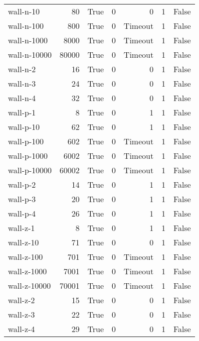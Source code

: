 \begin{longtable}{lrlrrrl}
wall-n-10 & 80 & True & 0 & 0 & 1 & False \\
wall-n-100 & 800 & True & 0 & Timeout & 1 & False \\
wall-n-1000 & 8000 & True & 0 & Timeout & 1 & False \\
wall-n-10000 & 80000 & True & 0 & Timeout & 1 & False \\
wall-n-2 & 16 & True & 0 & 0 & 1 & False \\
wall-n-3 & 24 & True & 0 & 0 & 1 & False \\
wall-n-4 & 32 & True & 0 & 0 & 1 & False \\
wall-p-1 & 8 & True & 0 & 1 & 1 & False \\
wall-p-10 & 62 & True & 0 & 1 & 1 & False \\
wall-p-100 & 602 & True & 0 & Timeout & 1 & False \\
wall-p-1000 & 6002 & True & 0 & Timeout & 1 & False \\
wall-p-10000 & 60002 & True & 0 & Timeout & 1 & False \\
wall-p-2 & 14 & True & 0 & 1 & 1 & False \\
wall-p-3 & 20 & True & 0 & 1 & 1 & False \\
wall-p-4 & 26 & True & 0 & 1 & 1 & False \\
wall-z-1 & 8 & True & 0 & 1 & 1 & False \\
wall-z-10 & 71 & True & 0 & 0 & 1 & False \\
wall-z-100 & 701 & True & 0 & Timeout & 1 & False \\
wall-z-1000 & 7001 & True & 0 & Timeout & 1 & False \\
wall-z-10000 & 70001 & True & 0 & Timeout & 1 & False \\
wall-z-2 & 15 & True & 0 & 0 & 1 & False \\
wall-z-3 & 22 & True & 0 & 0 & 1 & False \\
wall-z-4 & 29 & True & 0 & 0 & 1 & False \\
\end{longtable}